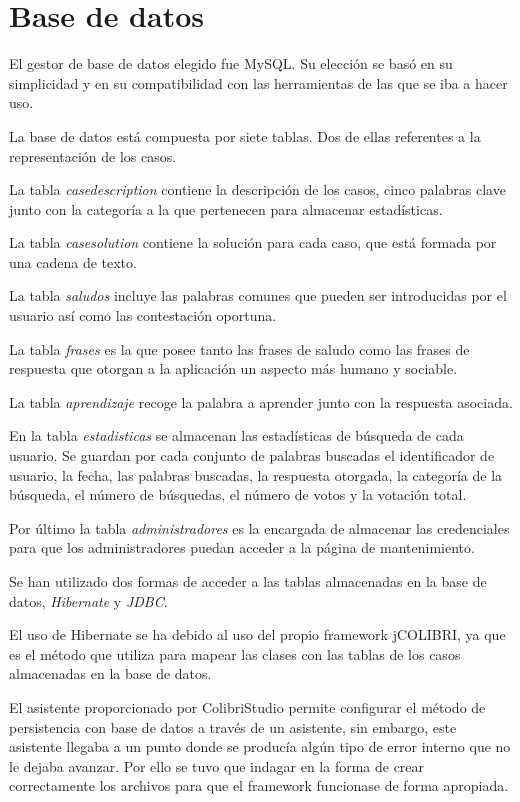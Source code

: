 \section{Base de datos}

El gestor de base de datos elegido fue MySQL. Su elección se basó en su simplicidad y en su compatibilidad con las herramientas de las que se iba a hacer uso.

La base de datos está compuesta por siete tablas. Dos de ellas referentes a la representación de los casos.

La tabla \emph{casedescription} contiene la descripción de los casos, cinco palabras clave junto con la categoría a la que pertenecen para almacenar estadísticas.

La tabla \emph{casesolution} contiene la solución para cada caso, que está formada por una cadena de texto.

La tabla \emph{saludos} incluye las palabras comunes que pueden ser introducidas por el usuario así como las contestación oportuna.

La tabla \emph{frases} es la que posee tanto las frases de saludo como las frases de respuesta que otorgan a la aplicación un aspecto más humano y sociable.

La tabla \emph{aprendizaje} recoge la palabra a aprender junto con la respuesta asociada.

En la tabla \emph{estadisticas} se almacenan las estadísticas de búsqueda de cada usuario. Se guardan por cada conjunto de palabras buscadas el identificador de usuario, la fecha, las palabras buscadas, la respuesta otorgada, la categoría de la búsqueda, el número de búsquedas, el número de votos y la votación total.

Por último la tabla \emph{administradores} es la encargada de almacenar las credenciales para que los administradores puedan acceder a la página de mantenimiento.

Se han utilizado dos formas de acceder a las tablas almacenadas en la base de datos, \emph{Hibernate} y \emph{JDBC}.

El uso de Hibernate se ha debido al uso del propio framework jCOLIBRI, ya que es el método que utiliza para mapear las clases con las tablas de los casos almacenadas en la base de datos.

El asistente proporcionado por ColibriStudio permite configurar el método de persistencia con base de datos a través de un asistente, sin embargo, este asistente llegaba a un punto donde se producía algún tipo de error interno que no le dejaba avanzar. Por ello se tuvo que indagar en la forma de crear correctamente los archivos para que el framework funcionase de forma apropiada.

